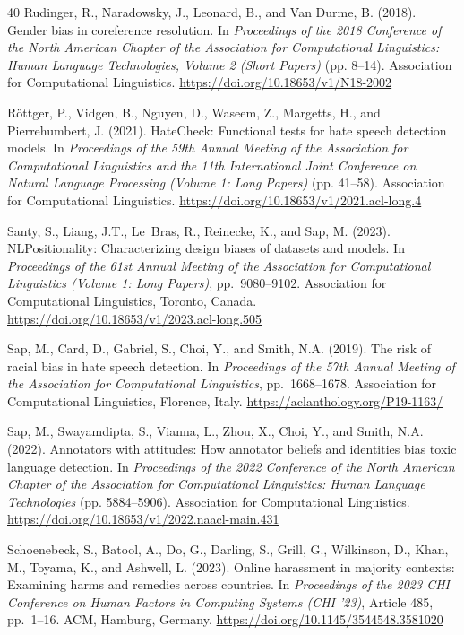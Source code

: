 \documentclass[a4paper,fleqn,review]{cas-sc}
\begin{document}
\begin{thebibliography}{40}
Rudinger, R., Naradowsky, J., Leonard, B., and Van Durme, B. (2018).
Gender bias in coreference resolution.
In \emph{Proceedings of the 2018 Conference of the North American Chapter of the Association for Computational Linguistics: Human Language Technologies, Volume 2 (Short Papers)} (pp. 8--14).
Association for Computational Linguistics.
\url{https://doi.org/10.18653/v1/N18-2002}

R\"ottger, P., Vidgen, B., Nguyen, D., Waseem, Z., Margetts, H., and Pierrehumbert, J. (2021).
HateCheck: Functional tests for hate speech detection models.
In \emph{Proceedings of the 59th Annual Meeting of the Association for Computational Linguistics and the 11th International Joint Conference on Natural Language Processing (Volume 1: Long Papers)} (pp. 41--58).
Association for Computational Linguistics.
\url{https://doi.org/10.18653/v1/2021.acl-long.4}

Santy, S., Liang, J.T., Le~Bras, R., Reinecke, K., and Sap, M. (2023).
NLPositionality: Characterizing design biases of datasets and models.
In \emph{Proceedings of the 61st Annual Meeting of the Association for Computational Linguistics (Volume 1: Long Papers)}, pp.~9080--9102. Association for Computational Linguistics, Toronto, Canada.
\url{https://doi.org/10.18653/v1/2023.acl-long.505}

Sap, M., Card, D., Gabriel, S., Choi, Y., and Smith, N.A. (2019).
The risk of racial bias in hate speech detection.
In \emph{Proceedings of the 57th Annual Meeting of the Association for Computational Linguistics}, pp.~1668--1678. Association for Computational Linguistics, Florence, Italy.
\url{https://aclanthology.org/P19-1163/}

Sap, M., Swayamdipta, S., Vianna, L., Zhou, X., Choi, Y., and Smith, N.A. (2022).
Annotators with attitudes: How annotator beliefs and identities bias toxic language detection.
In \emph{Proceedings of the 2022 Conference of the North American Chapter of the Association for Computational Linguistics: Human Language Technologies} (pp. 5884--5906).
Association for Computational Linguistics.
\url{https://doi.org/10.18653/v1/2022.naacl-main.431}

Schoenebeck, S., Batool, A., Do, G., Darling, S., Grill, G., Wilkinson, D., Khan, M., Toyama, K., and Ashwell, L. (2023).
Online harassment in majority contexts: Examining harms and remedies across countries.
In \emph{Proceedings of the 2023 CHI Conference on Human Factors in Computing Systems (CHI '23)}, Article 485, pp.~1--16. ACM, Hamburg, Germany.
\url{https://doi.org/10.1145/3544548.3581020}


\end{thebibliography}
\end{document}
